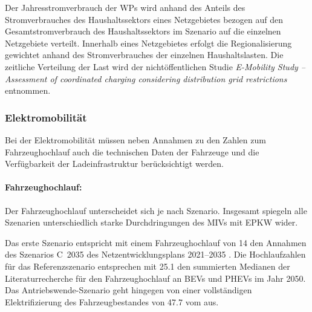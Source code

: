 

Der Jahresstromverbrauch der \glspl{WP} wird anhand des Anteils des Stromverbrauches des Haushaltssektors eines Netzgebietes bezogen auf den Gesamtstromverbrauch des Haushaltssektors im Szenario \ego auf die einzelnen Netzgebiete verteilt.
Innerhalb eines Netzgebietes erfolgt die Regionalisierung gewichtet anhand des Stromverbrauches der einzelnen Haushaltslasten.
Die zeitliche Verteilung der Last wird der nichtöffentlichen Studie \textit{E-Mobility Study {--} Assessment of coordinated charging considering distribution grid restrictions} \cite{Schachler} entnommen.


\subsubsection{Elektromobilität}\label{chap:EMob_Szenarien}

Bei der Elektromobilität müssen neben Annahmen zu den Zahlen zum Fahrzeughochlauf auch die technischen Daten der Fahrzeuge und die Verfügbarkeit der Ladeinfrastruktur berücksichtigt werden.


\paragraph{Fahrzeughochlauf:}
Der Fahrzeughochlauf unterscheidet sich je nach Szenario.
Insgesamt spiegeln alle Szenarien unterschiedlich starke Durchdringungen des \glspl{MIV} mit \gls{EPKW} wider.\medskip

Das erste Szenario entspricht mit einem Fahrzeughochlauf von \SI{14}{\MioStk} den Annahmen des Szenarios C~\num{2035} des Netzentwicklungsplans \numrange[range-phrase=~{--}~]{2021}{2035} \cite{BNetzA2020}.
Die Hochlaufzahlen für das Referenzszenario entsprechen mit \SI{25.1}{\MioStk} den summierten Medianen der Literaturrecherche für den Fahrzeughochlauf an \glspl{BEV} und \glspl{PHEV} im Jahr \num{2050}.
Das Antriebswende-Szenario geht hingegen von einer vollständigen Elektrifizierung des Fahrzeugbestandes von \SI{47.7}{\MioStk} vom  \cite{KBA2020} aus.



